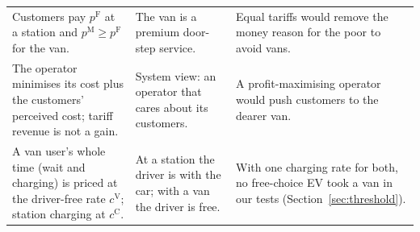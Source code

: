\documentclass[11pt,a4paper]{article}
\begin{document}
\begin{xltabular}{\textwidth}{@{}>{\raggedright\arraybackslash}p{4.6cm}>{\raggedright\arraybackslash}p{5.2cm}X@{}}
Customers pay $p^{\mathrm F}$ at a station and $p^{\mathrm M}\ge p^{\mathrm F}$ for the van. & The van is a premium door-step service. & Equal tariffs would remove the money reason for the poor to avoid vans. \\
The operator minimises its cost plus the customers' perceived cost; tariff revenue is not a gain. & System view: an operator that cares about its customers. & A profit-maximising operator would push customers to the dearer van. \\
A van user's whole time (wait and charging) is priced at the driver-free rate $c^{\mathrm V}$; station charging at $c^{\mathrm C}$. & At a station the driver is with the car; with a van the driver is free. & With one charging rate for both, no free-choice EV took a van in our tests (Section~\ref{sec:threshold}). \\
\bottomrule
\end{xltabular}
\end{document}
